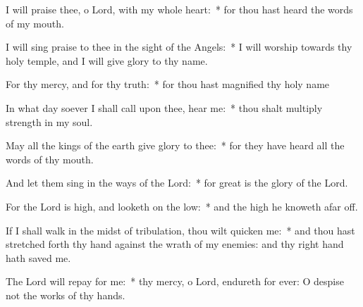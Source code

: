 \item I will praise thee, o Lord, with my whole heart:~* for thou hast heard the words of my mouth.
\item I will sing praise to thee in the sight of the Angels:~* I will worship towards thy holy temple, and I will give glory to thy name.
\item For thy mercy, and for thy truth:~* for thou hast magnified thy holy name
\item In what day soever I shall call upon thee, hear me:~* thou shalt multiply strength in my soul.
\item May all the kings of the earth give glory to thee:~* for they have heard all the words of thy mouth.
\item And let them sing in the ways of the Lord:~* for great is the glory of the Lord.
\item For the Lord is high, and looketh on the low:~* and the high he knoweth afar off.
\item If I shall walk in the midst of tribulation, thou wilt quicken me:~* and thou hast stretched forth thy hand against the wrath of my enemies: and thy right hand hath saved me.
\item The Lord will repay for me:~* thy mercy, o Lord, endureth for ever: O despise not the works of thy hands.